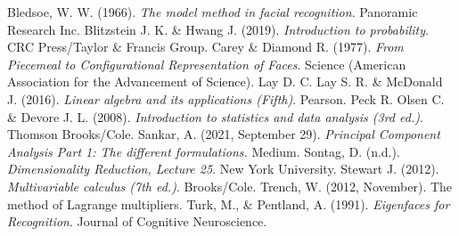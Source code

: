\documentclass{article}
\begin{document}
\pagebreak
\begin{thebibliography}{10}

 Bledsoe, W. W. (1966). \emph{The model method in facial recognition}. Panoramic Research Inc. 
 Blitzstein J. K. \& Hwang J. (2019). \emph{Introduction to probability}. CRC Press/Taylor \& Francis Group.
 Carey \& Diamond R. (1977). \emph{From Piecemeal to Configurational Representation of Faces}. Science (American Association for the Advancement of Science). 
 Lay D. C. Lay S. R. \& McDonald J. (2016). \emph{Linear algebra and its applications (Fifth)}. Pearson. 
 Peck R. Olsen C. \& Devore J. L. (2008). \emph{Introduction to statistics and data analysis (3rd ed.)}. Thomson Brooks/Cole.
 Sankar, A. (2021, September 29). \emph{Principal Component Analysis Part 1: The different formulations.} Medium.
 Sontag, D. (n.d.). \emph{Dimensionality Reduction, Lecture 25}. New York University. 
 Stewart J. (2012). \emph{Multivariable calculus (7th ed.)}. Brooks/Cole.
 Trench, W. (2012, November). The method of Lagrange multipliers.
 Turk, M., \& Pentland, A. (1991). \emph{Eigenfaces for Recognition}. Journal of Cognitive Neuroscience.

\end{thebibliography}
\end{document}
